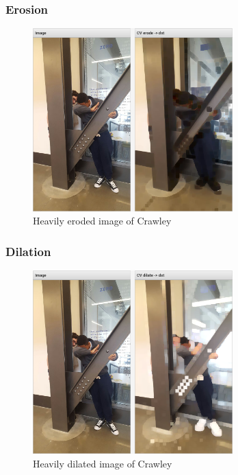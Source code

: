 \documentclass[../main.tex]{subfiles}
\begin{document}
\subsubsection{Erosion}
\begin{figure}[H]
    \centering
    \includegraphics[height=200pt]{sections/vision/images/opencv/crawley/crawleyErode.png}
    \caption{Heavily eroded image of Crawley}
\end{figure}

\subsubsection{Dilation}
\begin{figure}[H]
    \centering
    \includegraphics[height=200pt]{sections/vision/images/opencv/crawley/crawleyDilate.png}
    \caption{Heavily dilated image of Crawley}
\end{figure}
\end{document}
